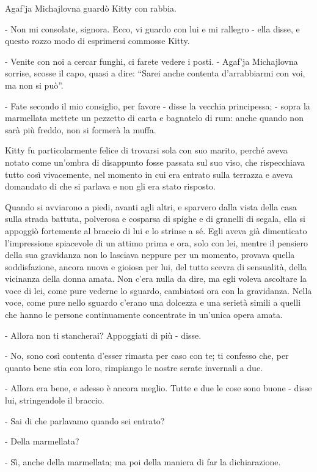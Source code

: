 Agaf'ja Michajlovna guardò Kitty con rabbia. 

- Non mi consolate, signora. Ecco, vi guardo con lui e mi rallegro - ella disse, e questo rozzo modo di esprimersi commosse Kitty. 

- Venite con noi a cercar funghi, ci farete vedere i posti. - Agaf'ja Michajlovna sorrise, scosse il capo, quasi a dire: ``Sarei anche contenta d'arrabbiarmi con voi, ma non si può''. 

- Fate secondo il mio consiglio, per favore - disse la vecchia principessa; - sopra la marmellata mettete un pezzetto di carta e bagnatelo di rum: anche quando non sarà più freddo, non si formerà la muffa. 

\label{iii-5} 

Kitty fu particolarmente felice di trovarsi sola con suo marito, perché aveva notato come un'ombra di disappunto fosse passata sul suo viso, che rispecchiava tutto così vivacemente, nel momento in cui era entrato sulla terrazza e aveva domandato di che si parlava e non gli era stato risposto. 

Quando si avviarono a piedi, avanti agli altri, e sparvero dalla vista della casa sulla strada battuta, polverosa e cosparsa di spighe e di granelli di segala, ella si appoggiò fortemente al braccio di lui e lo strinse a sé. Egli aveva già dimenticato l'impressione spiacevole di un attimo prima e ora, solo con lei, mentre il pensiero della sua gravidanza non lo lasciava neppure per un momento, provava quella soddisfazione, ancora nuova e gioiosa per lui, del tutto scevra di sensualità, della vicinanza della donna amata. Non c'era nulla da dire, ma egli voleva ascoltare la voce di lei, come pure vederne lo sguardo, cambiatosi ora con la gravidanza. Nella voce, come pure nello sguardo c'erano una dolcezza e una serietà simili a quelli che hanno le persone continuamente concentrate in un'unica opera amata. 

- Allora non ti stancherai? Appoggiati di più - disse. 

- No, sono così contenta d'esser rimasta per caso con te; ti confesso che, per quanto bene stia con loro, rimpiango le nostre serate invernali a due. 

- Allora era bene, e adesso è ancora meglio. Tutte e due le cose sono buone - disse lui, stringendole il braccio. 

- Sai di che parlavamo quando sei entrato? 

- Della marmellata? 

- Sì, anche della marmellata; ma poi della maniera di far la dichiarazione. 

